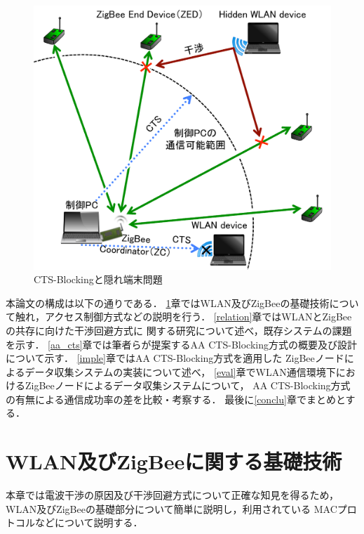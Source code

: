 \documentclass[12pt]{jreport}
\begin{document}
\begin{figure}[bt]
 \centering
 \includegraphics[width=\columnwidth]{figure/cts_blocking.pdf}
 \caption{CTS-Blockingと隠れ端末問題}
 \label{fig:cts_blocking}
\end{figure}

本論文の構成は以下の通りである．
\ref{fundamental}章ではWLAN及びZigBeeの基礎技術について触れ，アクセス制御方式などの説明を行う．
\ref{relation}章ではWLANとZigBeeの共存に向けた干渉回避方式に
関する研究について述べ，既存システムの課題を示す．
\ref{aa_cts}章では筆者らが提案するAA CTS-Blocking方式の概要及び設計について示す．
\ref{imple}章ではAA CTS-Blocking方式を適用した
ZigBeeノードによるデータ収集システムの実装について述べ，
\ref{eval}章でWLAN通信環境下におけるZigBeeノードによるデータ収集システムについて，
AA CTS-Blocking方式の有無による通信成功率の差を比較・考察する．
最後に\ref{conclu}章でまとめとする．

\chapter{WLAN及びZigBeeに関する基礎技術}\label{fundamental}%
本章では電波干渉の原因及び干渉回避方式について正確な知見を得るため，
WLAN及びZigBeeの基礎部分について簡単に説明し，利用されている
MACプロトコルなどについて説明する．\\

\end{document}

